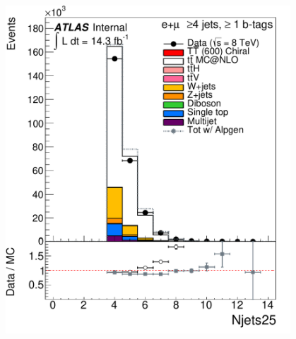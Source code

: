 \begin{frame}
\begin{minipage}{.5\textwidth}
{\includegraphics[width=0.8\textwidth]{pics/Njets25_ELEMUON_4jetin1btagin_NOMINAL}

}

\end{minipage}

\end{frame}


